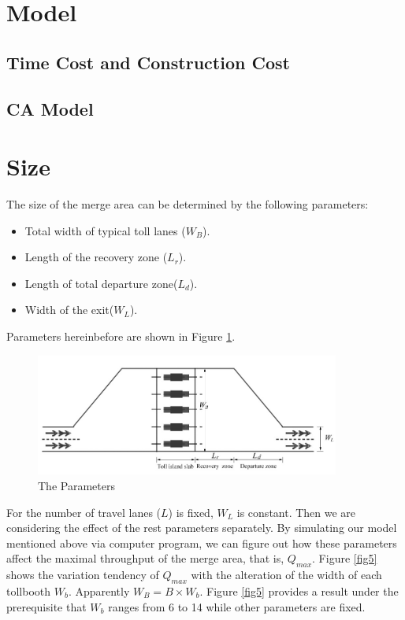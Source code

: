 \documentclass{mcmthesis}
\begin{document}
\section{Model}
\subsection{Time Cost and Construction Cost}
\subsection{CA Model}

\section{Size}

The size of the merge area can be determined by
the following parameters:
\begin{itemize}
\item Total width of typical toll lanes ($W_{B}$).
\item Length of the recovery zone ($L_{r}$).
\item Length of total departure zone($L_{d}$).
\item Width of the exit($W_{L}$).
\end{itemize}
Parameters hereinbefore are shown in Figure \ref{fig4}.
\begin{figure}[h]
\small
\centering
\includegraphics[width=10cm]{figure4}
\caption{The Parameters}\label{fig4}
\end{figure}
For the number of travel lanes ($L$) is fixed, $W_{L}$ is
constant. Then we are considering the effect of the
rest parameters separately. By simulating our model
mentioned above via computer program, we can figure
out how these parameters affect the maximal throughput
of the merge area, that is, $Q_{max}$.
Figure \ref{fig5} shows the variation tendency of
$Q_{max}$ with
the alteration of the width of each tollbooth $W_{b}$.
Apparently $W_{B} = B \times W_{b}$. Figure \ref{fig5}
provides a result
under the prerequisite that $W_b$ ranges from 6 to 14
while other parameters are fixed.
\end{document}
